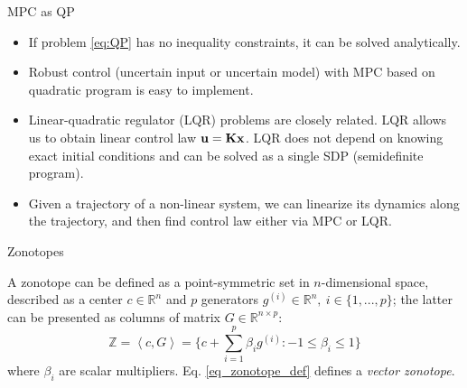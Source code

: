 \documentclass{beamer}
\newcommand{\Zo}[2] {\left\langle {#1},{#2}
	\right\rangle}
\begin{document}
\begin{frame}{MPC as QP}
	\begin{flushleft}
		
		\begin{itemize}
			\item If problem \eqref{eq:QP} has no inequality constraints, it can be solved analytically.
			
			\item Robust control (uncertain input or uncertain model) with MPC based on quadratic program is easy to implement.
			
			\item Linear-quadratic regulator (LQR) problems are closely related. LQR allows us to obtain linear control law $\mathbf{u} = \mathbf{K}\mathbf{x}$. LQR does not depend on knowing exact initial conditions and can be solved as a single SDP (semidefinite program).
			
			\item Given a trajectory of a non-linear system, we can linearize its dynamics along the trajectory, and then find control law either via MPC or LQR.
		\end{itemize}
		
	\end{flushleft}
\end{frame}



\begin{frame}
	
	
\end{frame}


\begin{frame}{Zonotopes}
	\begin{flushleft}
		
		A zonotope can be defined as a point-symmetric set in $n$-dimensional space, described as a center $c \in \mathbb{R}^n $ and $p$ generators $g^{(i)} \in \mathbb{R}^n, \ i \in \{1,...,p\}$; the latter can be presented as columns of matrix $G \in \mathbb{R}^{n \times p}$:
		\begin{equation} 
			\label{eq_zonotope_def}
			\mathbb{Z} = \Zo{c}{G} = \{c + \sum_{i=1}^p \beta_i g^{(i)} :  -1 \leq \beta_i \leq 1 \}
		\end{equation}
		where $\beta_i$ are scalar multipliers. Eq. \eqref{eq_zonotope_def} defines a \emph{vector zonotope}. 
		
	\end{flushleft}
\end{frame}
\end{document}
